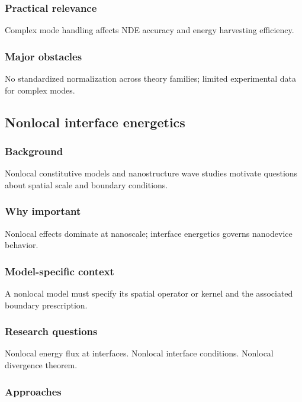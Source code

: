 \subsubsection{Practical relevance}

Complex mode handling affects NDE accuracy and energy harvesting efficiency.

\subsubsection{Major obstacles}

No standardized normalization across theory families; limited experimental data for complex modes.

\subsection{Nonlocal interface energetics}
\label{sec:15.6}

\subsubsection{Background}

Nonlocal constitutive models and nanostructure wave studies motivate questions about spatial scale and boundary conditions.

\subsubsection{Why important}

Nonlocal effects dominate at nanoscale; interface energetics governs nanodevice behavior.

\subsubsection{Model-specific context}

A nonlocal model must specify its spatial operator or kernel and the associated boundary prescription.

\subsubsection{Research questions}

Nonlocal energy flux at interfaces. Nonlocal interface conditions. Nonlocal divergence theorem.

\subsubsection{Approaches}

